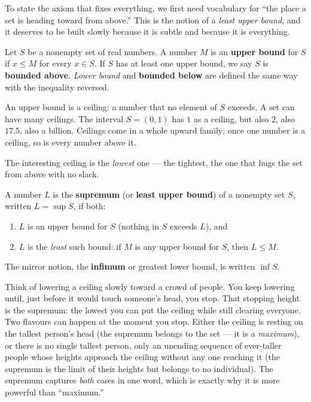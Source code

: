To state the axiom that fixes everything, we first need vocabulary for ``the place a set
is heading toward from above.'' This is the notion of a \emph{least upper bound}, and it
deserves to be built slowly because it is subtle and because it is everything.

\begin{definition}
\label{ch41:def-bounded}
Let $S$ be a nonempty set of real numbers. A number $M$ is an \textbf{upper bound} for
$S$ if $x \le M$ for every $x \in S$. If $S$ has at least one upper bound, we say $S$ is
\textbf{bounded above}. \emph{Lower bound} and \textbf{bounded below} are defined the same
way with the inequality reversed.
\end{definition}

An upper bound is a ceiling: a number that no element of $S$ exceeds. A set can have many
ceilings. The interval $S = (0,1)$ has $1$ as a ceiling, but also $2$, also $17.5$, also a
billion. Ceilings come in a whole upward family; once one number is a ceiling, so is every
number above it.

The interesting ceiling is the \emph{lowest} one --- the tightest, the one that hugs the
set from above with no slack.

\begin{definition}
\label{ch41:def-sup}
A number $L$ is the \textbf{supremum} (or \textbf{least upper bound}) of a nonempty set
$S$, written $L = \sup S$, if both:
\begin{enumerate}
  \item $L$ is an upper bound for $S$ (nothing in $S$ exceeds $L$), and
  \item $L$ is the \emph{least} such bound: if $M$ is any upper bound for $S$, then
        $L \le M$.
\end{enumerate}
The mirror notion, the \textbf{infimum} or greatest lower bound, is written $\inf S$.
\end{definition}

\begin{intuitionbox}
Think of lowering a ceiling slowly toward a crowd of people. You keep lowering until,
just before it would touch someone's head, you stop. That stopping height is the
supremum: the lowest you can put the ceiling while still clearing everyone. Two flavours
can happen at the moment you stop. Either the ceiling is resting on the tallest person's
head (the supremum belongs to the set --- it is a \emph{maximum}), or there is no single
tallest person, only an unending sequence of ever-taller people whose heights approach
the ceiling without any one reaching it (the supremum is the limit of their heights but
belongs to no individual). The supremum captures \emph{both} cases in one word, which is
exactly why it is more powerful than ``maximum.''
\end{intuitionbox}

